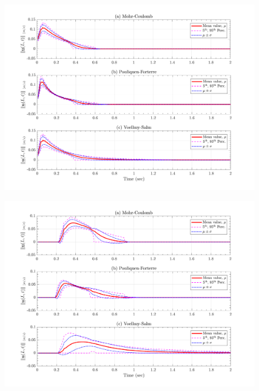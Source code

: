 \documentclass{article}
\begin{document}
\begin{figure}[H]
	\begin{minipage}[b]{0.5\linewidth}
    	\centering
    	\includegraphics[width=1\textwidth]{InclinedPlane/LocalRecords/Records/Vel_L1.png}
    	\label{fig:Ramp-L1-Vel}
	\end{minipage}
	\begin{minipage}[b]{0.5\linewidth}
		\centering
		\includegraphics[width=1\textwidth]{InclinedPlane/LocalRecords/Records/Vel_L2.png}
    	\label{fig:Ramp-L2-Vel}
    \end{minipage}


\end{figure}
\end{document}
